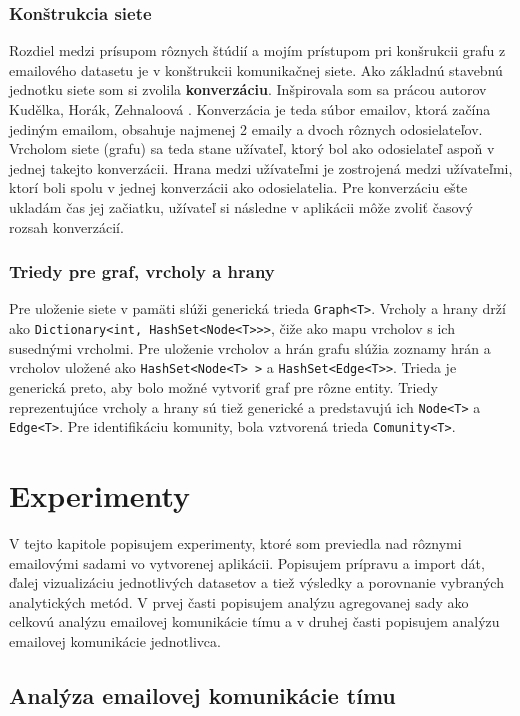 \documentclass[slovak,master,public,dept460,male,cpdeclaration,oneside]{diploma}
\begin{document}
\subsubsection{Konštrukcia siete}
Rozdiel medzi prísupom rôznych štúdií a mojím prístupom pri konšrukcii grafu z emailového datasetu je v konštrukcii komunikačnej siete. Ako základnú stavebnú jednotku siete som si zvolila \textbf{konverzáciu}. Inšpirovala som sa prácou autorov Kudělka, Horák, Zehnaloová \cite{10}. Konverzácia je teda súbor emailov, ktorá začína jediným emailom, obsahuje najmenej 2 emaily a dvoch rôznych odosielateľov. Vrcholom siete (grafu) sa teda stane užívateľ, ktorý bol ako odosielateľ aspoň v jednej takejto konverzácii. Hrana medzi užívateľmi je zostrojená medzi užívateľmi, ktorí boli spolu v jednej konverzácii ako odosielatelia. Pre konverzáciu ešte ukladám čas jej začiatku, užívateľ si následne v aplikácii môže zvoliť časový rozsah konverzácií.

\subsubsection{Triedy pre graf, vrcholy a hrany}
Pre uloženie siete v pamäti slúži generická trieda \texttt{Graph<T>}. Vrcholy a hrany drží ako \texttt{Dictionary<int, HashSet<Node<T>{}>{}>}, čiže ako mapu vrcholov s ich susednými vrcholmi. Pre uloženie vrcholov a hrán grafu slúžia zoznamy hrán a vrcholov uložené ako \texttt{HashSet<Node<T> >} a \texttt{HashSet<Edge<T>{}>}. Trieda je generická preto, aby bolo možné vytvoriť graf pre rôzne entity. Triedy reprezentujúce vrcholy a hrany sú tiež generické a predstavujú ich \texttt{Node<T>} a \texttt{Edge<T>}. Pre identifikáciu komunity, bola vztvorená trieda \texttt{Comunity<T>}.



\section{Experimenty}
V tejto kapitole popisujem experimenty, ktoré som previedla nad rôznymi emailovými sadami vo vytvorenej aplikácii. Popisujem prípravu a import dát, ďalej vizualizáciu jednotlivých datasetov a tiež výsledky a porovnanie vybraných analytických metód. V prvej časti popisujem analýzu agregovanej sady ako celkovú analýzu emailovej komunikácie tímu a v druhej časti popisujem analýzu emailovej komunikácie jednotlivca.


\subsection{Analýza emailovej komunikácie tímu}
\end{document}
